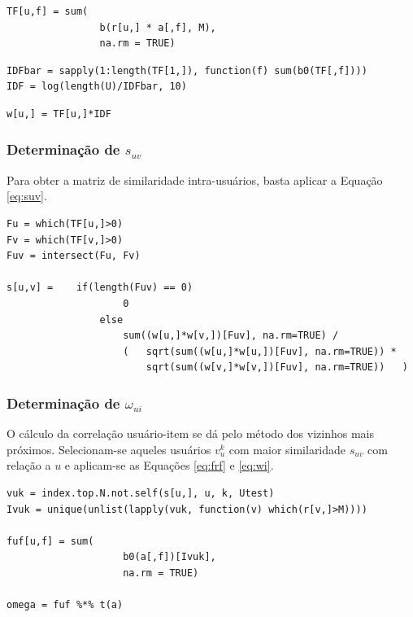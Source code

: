 \begin{lstlisting}[caption=Determinação de $\mathrm{TF}_{uf}$,label=lst:tf]
TF[u,f] = sum(
        		b(r[u,] * a[,f], M),
        		na.rm = TRUE)
\end{lstlisting}


\begin{lstlisting}[caption=Determinação de $\mathrm{IDF}_{f}$,label=lst:idf]
IDFbar = sapply(1:length(TF[1,]), function(f) sum(b0(TF[,f])))
IDF = log(length(U)/IDFbar, 10)
\end{lstlisting}

\begin{lstlisting}[caption=Determinação de $w_{uf}$,label=lst:wuf]
w[u,] = TF[u,]*IDF
\end{lstlisting}

\subsubsection{Determinação de $s_{uv}$} %
\label{ssub:determina_o_de_}

Para obter a matriz de similaridade intra-usuários, basta aplicar a Equação \ref{eq:suv}.

\begin{lstlisting}[caption=Determinação de $s_{uv}$]
Fu = which(TF[u,]>0)
Fv = which(TF[v,]>0)
Fuv = intersect(Fu, Fv)

s[u,v] = 	if(length(Fuv) == 0) 
					0 
				else 
					sum((w[u,]*w[v,])[Fuv], na.rm=TRUE) / 
					(	sqrt(sum((w[u,]*w[u,])[Fuv], na.rm=TRUE)) * 
						sqrt(sum((w[v,]*w[v,])[Fuv], na.rm=TRUE))	)

\end{lstlisting}

\subsubsection{Determinação de $\omega_{ui}$} %
\label{ssub:determina_o_de_}

O cálculo da correlação usuário-item se dá pelo método dos vizinhos mais próximos. Selecionam-se aqueles usuários $v_u^k$ com maior similaridade $s_{uv}$ com relação a $u$ e aplicam-se as Equações \ref{eq:frf} e \ref{eq:wi}.

\begin{lstlisting}[caption=Determinação de $\omega_{ui}$]
vuk = index.top.N.not.self(s[u,], u, k, Utest) 
Ivuk = unique(unlist(lapply(vuk, function(v) which(r[v,]>M))))

fuf[u,f] = sum(
					b0(a[,f])[Ivuk], 
					na.rm = TRUE)

omega = fuf %*% t(a)
\end{lstlisting}

